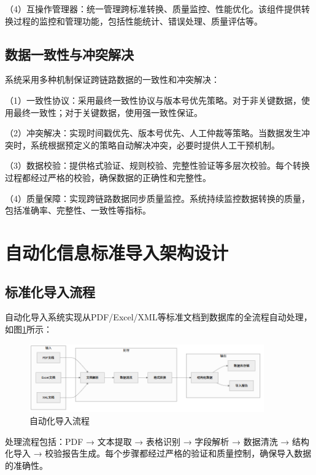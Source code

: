 （4）互操作管理器：统一管理跨标准转换、质量监控、性能优化。该组件提供转换过程的监控和管理功能，包括性能统计、错误处理、质量评估等。

\subsection{数据一致性与冲突解决}

系统采用多种机制保证跨链路数据的一致性和冲突解决：

（1）一致性协议：采用最终一致性协议与版本号优先策略。对于非关键数据，使用最终一致性；对于关键数据，使用强一致性保证。

（2）冲突解决：实现时间戳优先、版本号优先、人工仲裁等策略。当数据发生冲突时，系统根据预定义的策略自动解决冲突，必要时提供人工干预机制。

（3）数据校验：提供格式验证、规则校验、完整性验证等多层次校验。每个转换过程都经过严格的校验，确保数据的正确性和完整性。

（4）质量保障：实现跨链路数据同步质量监控。系统持续监控数据转换的质量，包括准确率、完整性、一致性等指标。

\section{自动化信息标准导入架构设计}

\subsection{标准化导入流程}

自动化导入系统实现从PDF/Excel/XML等标准文档到数据库的全流程自动处理，如图\ref{fig:import_pipeline}所示：

\begin{figure}[H]
    \centering
    \includegraphics[width=0.9\textwidth]{chapters/fig-0/import_pipeline_simple.png}
    \caption{自动化导入流程}
    \label{fig:import_pipeline}
\end{figure}

处理流程包括：PDF → 文本提取 → 表格识别 → 字段解析 → 数据清洗 → 结构化导入 → 校验报告生成。每个步骤都经过严格的验证和质量控制，确保导入数据的准确性。

